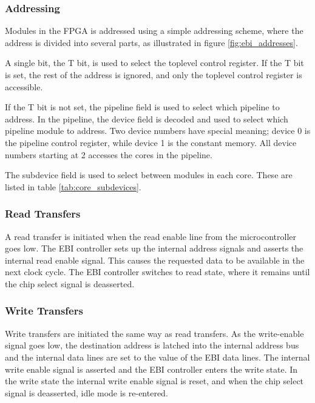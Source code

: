 

\FloatBarrier
\subsubsection{Addressing}

Modules in the FPGA is addressed using a simple addressing scheme, where the
address is divided into several parts, as illustrated in figure \ref{fig:ebi_addresses}.



A single bit, the T bit, is used to select the toplevel control register.
If the T bit is set, the rest of the address is ignored, and only the toplevel
control register is accessible.

If the T bit is not set, the pipeline field is used to select which pipeline
to address. In the pipeline, the device field is decoded and used to select
which pipeline module to address. Two device numbers have special meaning;
device 0 is the pipeline control register, while device 1 is the constant
memory. All device numbers starting at 2 accesses the cores in the pipeline.

The subdevice field is used to select between modules in each core. These
are listed in table \ref{tab:core_subdevices}.



\FloatBarrier
\subsubsection{Read Transfers}

A read transfer is initiated when the read enable line from the microcontroller
goes low. The EBI controller sets up the internal address signals and asserts
the internal read enable signal. This causes the requested data to be available
in the next clock cycle. The EBI controller switches to read state, where it
remains until the chip select signal is deasserted.

\subsubsection{Write Transfers}

Write transfers are initiated the same way as read transfers. As the
write-enable signal goes low, the destination address is latched into the
internal address bus and the internal data lines are set to the value of the
EBI data lines. The internal write enable signal is asserted and the EBI
controller enters the write state. In the write state the internal write enable
signal is reset, and when the chip select signal is deasserted, idle mode
is re-entered.
